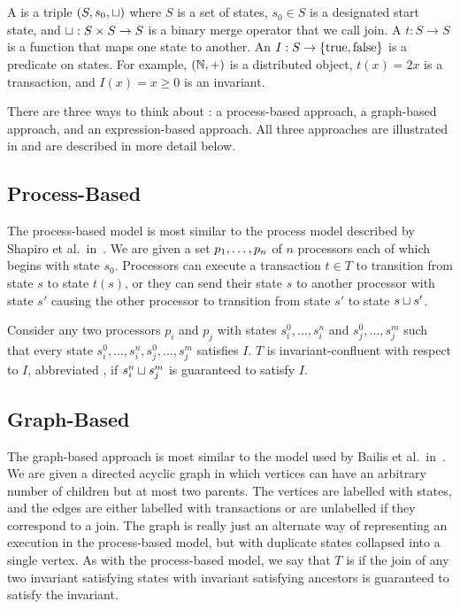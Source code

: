 \section{\Iconfluence{}}
A  is a triple $(S, s_0, \sqcup)$ where $S$ is a set
of states, $s_0 \in S$ is a designated start state, and $\sqcup: S \times S \to
S$ is a binary merge operator that we call join. A  $t: S
\to S$ is a function that maps one state to another.  An 
$I: S \to \{\text{true}, \text{false}\}$ is a predicate on states. For
example, $(\mathbb{N}, +)$ is a distributed object, $t(x) = 2x$ is a transaction,
and $I(x) = x \geq 0$ is an invariant.

There are three ways to think about \Iconfluence{}: a process-based approach, a
graph-based approach, and an expression-based approach. All three approaches
are illustrated in  and are described in more
detail below.




\subsection{Process-Based}
The process-based model is most similar to the process model described by
Shapiro et al.\ in~\cite{shapiro2011conflict}. We are given a set
${p}_{1}, \ldots, {p}_{n}$ of $n$ processors each of which begins with state $s_0$.
Processors can execute a transaction $t \in T$ to transition from state $s$ to
state $t(s)$, or they can send their state $s$ to another processor with state
$s'$ causing the other processor to transition from state $s'$ to state $s
\sqcup s'$.

Consider any two processors $p_i$ and $p_j$ with states $s_i^0, \ldots, s_i^n$
and $s_j^0, \ldots, s_j^m$ such that every state $s_i^0, \ldots, s_i^n, s_j^0,
\ldots, s_j^m$ satisfies $I$. $T$ is invariant-confluent with respect to $I$,
abbreviated , if $s_i^n \sqcup s_j^m$ is guaranteed to
satisfy $I$.

\subsection{Graph-Based}
The graph-based approach is most similar to the model used by Bailis et al.\
in~\cite{bailis2014coordination}. We are given a directed acyclic graph in
which vertices can have an arbitrary number of children but at most two
parents. The vertices are labelled with states, and the edges are either
labelled with transactions or are unlabelled if they correspond to a join. The
graph is really just an alternate way of representing an execution in the
process-based model, but with duplicate states collapsed into a single vertex.
As with the process-based model, we say that $T$ is \Iconfluent{} if the join
of any two invariant satisfying states with invariant satisfying ancestors is
guaranteed to satisfy the invariant.

